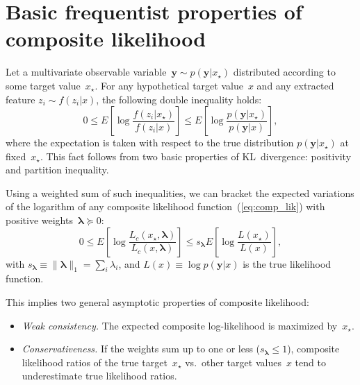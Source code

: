 \documentclass[english]{scrartcl}
\def\y{{\mathbf{y}}}
\newcommand{\blambda}{{\boldsymbol{\lambda}}}
\begin{document}





\appendix


\section{Basic frequentist properties of composite likelihood}
\label{app:frequentist}

Let a multivariate observable variable~$\y \sim p(\y|x_\star)$ distributed according to some target value~$x_\star$. For any hypothetical target value~$x$ and any extracted feature $z_i\sim f(z_i|x)$, the following double inequality holds:
$$
0 \leq
E\left[
\log \frac{f(z_i|x_\star)}{f(z_i|x)}
\right]
\leq
E\left[
\log \frac{p(\y|x_\star)}{p(\y|x)}
\right],
$$
where the expectation is taken with respect to the true distribution $p(\y|x_\star)$ at fixed~$x_\star$. This fact follows from two basic properties of KL~divergence: positivity and partition inequality.

Using a weighted sum of such inequalities, we can bracket the expected variations of the logarithm of any composite likelihood function~(\ref{eq:comp_lik}) with positive weights~$\blambda\succeq 0$:
\begin{equation}
\label{eq:variation_bound}
0 \leq
E\left[ \log \frac{L_c(x_\star, \blambda)}{L_c(x,\blambda)} \right]
\leq 
s_\blambda E\left[ \log \frac{L(x_\star)}{L(x)} \right]
,
\end{equation}
with $s_\blambda\equiv \|\blambda\|_1 =\sum_i \lambda_i$, and $L(x)\equiv \log p(\y|x)$ is the true likelihood function.

This implies two general asymptotic properties of composite likelihood:
\begin{itemize}
\item {\em Weak consistency.} The expected composite log-likelihood is maximized by~$x_\star$.
\item {\em Conservativeness.} If the weights sum up to one or less ($s_\blambda\leq 1$), composite likelihood ratios of the true target~$x_\star$ vs.~other target values~$x$ tend to  underestimate true likelihood ratios.
\end{itemize}
\end{document}
